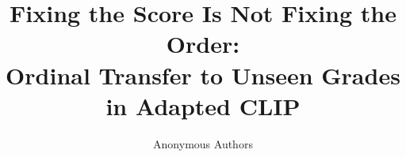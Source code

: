 \documentclass[10pt,twocolumn,letterpaper]{article}
\title{Fixing the Score Is Not Fixing the Order:\\
Ordinal Transfer to Unseen Grades in Adapted CLIP}
\author{Anonymous Authors}
\theoremstyle{definition}
\newif\ifpaperhasreferences
\newif\ifincludesupplement
\begin{document}
\maketitle










\ifpaperhasreferences
{
    \small
    
    
}
\fi

\ifincludesupplement

\fi
\end{document}
